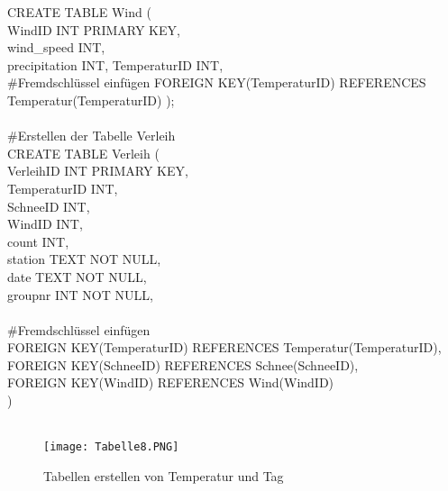 \documentclass[1pt]{article}
\begin{document}
CREATE TABLE Wind (\\
WindID INT PRIMARY KEY,\\
wind\_speed INT,\\
precipitation INT,
TemperaturID INT,
\\
 #Fremdschlüssel einfügen
FOREIGN KEY(TemperaturID) REFERENCES Temperatur(TemperaturID)
);\\
\\
 #Erstellen der Tabelle Verleih\\
CREATE TABLE Verleih (\\
VerleihID INT PRIMARY KEY,\\
TemperaturID INT,\\
SchneeID INT,\\
WindID INT,\\
count INT,\\
station TEXT NOT NULL,\\
date TEXT NOT NULL,\\
groupnr INT NOT NULL,\\
\\
 #Fremdschlüssel einfügen\\
FOREIGN KEY(TemperaturID) REFERENCES Temperatur(TemperaturID),\\
FOREIGN KEY(SchneeID) REFERENCES Schnee(SchneeID),\\
FOREIGN KEY(WindID) REFERENCES Wind(WindID)\\
)\\
\vspace{2cm}\
\begin{figure}[h] %
    \centering %
    \texttt{[image: Tabelle8.PNG]} %
    \caption{Tabellen erstellen von Temperatur und Tag}
   \label{fig:meinBild} %
\end{figure}\\
\\
\newpage
\end{document}
